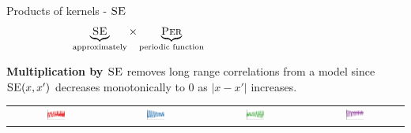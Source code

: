\begin{frame}{Products of kernels - ${\textsc{SE}}$}
  \begin{align*}
    \underbrace{\kSE}_{\textnormal{\scriptsize approximately}} \times
    \underbrace{\kPer}_{\textnormal{\scriptsize periodic function}} \phantom{\times 
    \underbrace{\kLin}_{\textnormal{\scriptsize with linearly growing amplitude}}}
  \end{align*}
  
  \vspace{\baselineskip}
  
  {\bf Multiplication by ${\textsc{SE}}$} removes long range correlations from a model since ${\textsc{SE}}(x,x')$ decreases monotonically to 0 as $|x - x'|$ increases.
  
  \vspace{\baselineskip}
  
  \begin{block}{}
    \begin{tabular}{cccc}
      \includegraphics[width=0.2\textwidth]{figures/trans_samples/draw_21} &
      \includegraphics[width=0.2\textwidth]{figures/trans_samples/draw_22} &
      \includegraphics[width=0.2\textwidth]{figures/trans_samples/draw_23} &
      \includegraphics[width=0.2\textwidth]{figures/trans_samples/draw_24}
    \end{tabular}
  \end{block}
\end{frame}

